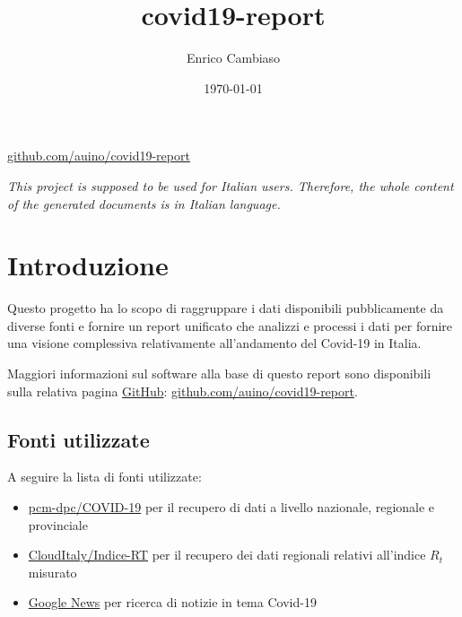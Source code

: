 \documentclass[12pt]{article}
\title{covid19-report}
\author{Enrico Cambiaso}
\date{\today}
\begin{document}
\begin{titlepage}
\maketitle
\thispagestyle{empty}
\vfill
{\centering \small \href{http://github.com/auino/covid19-report}{github.com/auino/covid19-report} \par}
\end{titlepage}

\tableofcontents

\newpage

\begin{center}
\emph{This project is supposed to be used for Italian users. Therefore, the whole content of the generated documents is in Italian language.}
\end{center}

\section{Introduzione}

Questo progetto ha lo scopo di raggruppare i dati disponibili pubblicamente da diverse fonti e fornire un report unificato che analizzi e processi i dati per fornire una visione complessiva relativamente all'andamento del Covid-19 in Italia.

Maggiori informazioni sul software alla base di questo report sono disponibili sulla relativa pagina \href{https://github.com}{GitHub}: \href{https://github.com/auino/covid19-report}{github.com/auino/covid19-report}.

\subsection{Fonti utilizzate}

A seguire la lista di fonti utilizzate:

\begin{itemize}
	\item \href{https://github.com/pcm-dpc/COVID-19}{pcm-dpc/COVID-19} per il recupero di dati a livello nazionale, regionale e provinciale
	\item \href{https://github.com/CloudItaly/Indice-RT}{CloudItaly/Indice-RT} per il recupero dei dati regionali relativi all'indice $R_t$ misurato
	\item \href{http://news.google.com}{Google News} per ricerca di notizie in tema Covid-19
\end{itemize}
\end{document}
